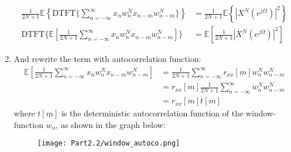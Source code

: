 \documentclass[12pt]{article}
\newcommand{\mexp}{\mathbb{E}}
\newcommand{\summ}[2]{\sum_{#1}^{#2}}
\newcommand{\sumninfinf}{\summ{n=-\infty}{\infty}}
\newcommand{\autocox}{r_{xx}}
\newcommand{\win}{w_n^N}
\newcommand{\DTFT}{\textrm{DTFT}}
\begin{document}
\begin{enumerate}
        \begin{align*}
            \frac{1}{2N+1}\mexp\left\{\DTFT\{\sumninfinf x_n \win x_{n-m} w_{n-m}^N \}\right\} &= \frac{1}{2N+1}\mexp\left\{|X^N(e^{j\Omega})|^2\right\} \\
            \DTFT\{\mexp[\frac{1}{2N+1}\sumninfinf x_n \win x_{n-m} w_{n-m}^N] \} &= \mexp[\frac{1}{2N+1}|X^N(e^{j\Omega})|^2]
        \end{align*}
        \item And rewrite the term with autocorrelation function:
        \begin{align*}
            \mexp[\frac{1}{2N+1}\sumninfinf x_n \win x_{n-m} w_{n-m}^N] &= \frac{1}{2N+1}\sumninfinf \autocox[m]\win w_{n-m}^N  \\
            &= \autocox[m]\frac{1}{2N+1}\sumninfinf \win w_{n-m}^N \\
            & = \autocox[m]t[m]
        \end{align*}
        where $t[m]$ is the deterministic autocorrelation function of the window-function $w_n$, as shown in the graph below:
\begin{figure}[H]
    \centering
    \texttt{[image: Part2.2/window\_autoco.png]}
\end{figure}

    \end{enumerate}
\end{document}
